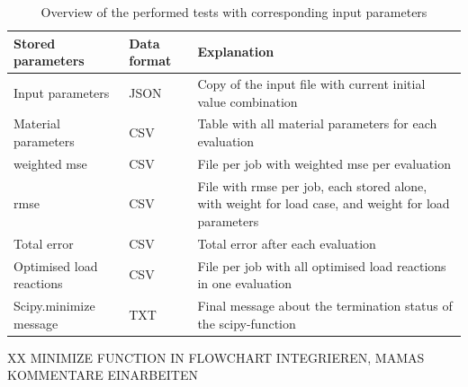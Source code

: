 \begin{table}[H]
    \centering
    \renewcommand{\arraystretch}{1.2}
    \caption{Overview of the performed tests with corresponding input parameters}
    \label{tab:storageData}
    \begin{tabular}{L{0.3\textwidth}|C{0.1\textwidth}L{0.5\textwidth}}
    \toprule
   \textbf{Stored parameters} & \textbf{Data format} & \textbf{Explanation}\\ \midrule
   Input parameters & JSON & Copy of the input file with current initial value combination\\ \hline
   Material parameters & CSV & Table with all material parameters for each evaluation\\\hline
   weighted \acrshort{mse} & CSV & File per job with weighted \acrshort{mse} per evaluation \\\hline
   \acrshort{rmse} & CSV & File with \acrshort{rmse} per job, each stored alone, with weight for load case, and weight for load parameters \\\hline
   Total error & CSV & Total error after each evaluation \\\hline
   Optimised load reactions & CSV & File per job with all optimised load reactions in one evaluation \\\hline
   Scipy.minimize message & TXT & Final message about the termination status of the scipy-function\\
    \bottomrule
    \end{tabular}
    
\end{table}

XX MINIMIZE FUNCTION IN FLOWCHART INTEGRIEREN, MAMAS KOMMENTARE EINARBEITEN




